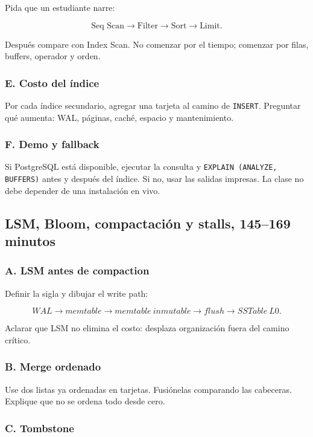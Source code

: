 \documentclass[variant=docente,cover=institutional,mode=screen]{ua-engineering-v6-article}
\begin{document}
Pida que un estudiante narre:

\[
\text{Seq Scan} \rightarrow \text{Filter} \rightarrow \text{Sort} \rightarrow \text{Limit}.
\]

Después compare con Index Scan. No comenzar por el tiempo; comenzar por filas, buffers, operador y orden.

\subsubsection*{E. Costo del índice}

Por cada índice secundario, agregar una tarjeta al camino de \texttt{INSERT}. Preguntar qué aumenta: WAL, páginas, caché, espacio y mantenimiento.

\subsubsection*{F. Demo y fallback}

Si PostgreSQL está disponible, ejecutar la consulta y \texttt{EXPLAIN (ANALYZE, BUFFERS)} antes y después del índice. Si no, usar las salidas impresas. La clase no debe depender de una instalación en vivo.

\subsection{LSM, Bloom, compactación y stalls, 145--169 minutos}

\subsubsection*{A. LSM antes de compaction}

Definir la sigla y dibujar el write path:

\[
WAL \rightarrow memtable \rightarrow memtable\ inmutable
\rightarrow flush \rightarrow SSTable\ L0.
\]

Aclarar que LSM no elimina el costo: desplaza organización fuera del camino crítico.

\subsubsection*{B. Merge ordenado}

Use dos listas ya ordenadas en tarjetas. Fusiónelas comparando las cabeceras. Explique que no se ordena todo desde cero.

\subsubsection*{C. Tombstone}
\end{document}
